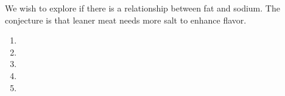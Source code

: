 

\nl We wish to explore if there is a relationship between fat and sodium. The conjecture is that leaner meat needs more salt to enhance flavor.
\begin{enumerate}[label=(\alph*)]
    \item \newpage
    \item \vspace{1in}
    \item \newpage
    \item \vspace{.75in}
    \item 
\end{enumerate}